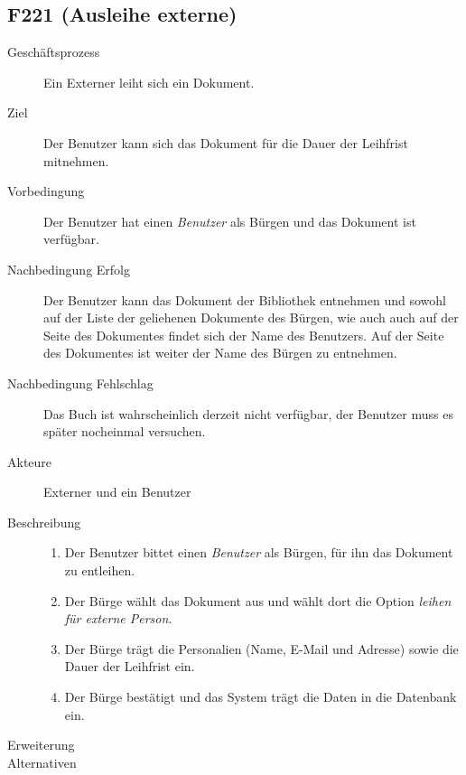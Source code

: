 \subsection{F221 (Ausleihe externe)}
\begin{description}
  \item[Geschäftsprozess]Ein Externer leiht sich ein Dokument.
  \item[Ziel]Der Benutzer kann sich das Dokument für die Dauer der Leihfrist mitnehmen.
  \item[Vorbedingung]Der Benutzer hat einen \emph{Benutzer} als Bürgen und das Dokument ist verfügbar.
  \item[Nachbedingung Erfolg]Der Benutzer kann das Dokument der Bibliothek entnehmen und sowohl auf der Liste der geliehenen Dokumente des Bürgen, wie auch auch auf der Seite des Dokumentes findet sich der Name des  Benutzers. Auf der Seite des Dokumentes ist weiter der Name des Bürgen zu entnehmen.
  \item[Nachbedingung Fehlschlag]Das Buch ist wahrscheinlich derzeit nicht verfügbar, der Benutzer muss es später nocheinmal versuchen.
  \item[Akteure]Externer und ein Benutzer 
  \item[Beschreibung]\hfill
    \begin{enumerate}
      \item Der Benutzer bittet einen \emph{Benutzer} als Bürgen, für ihn das Dokument zu entleihen.
      \item Der Bürge wählt das Dokument aus und wählt dort die Option \emph{leihen für externe Person}.
      \item Der Bürge trägt die Personalien (Name, E-Mail und Adresse) sowie die Dauer der Leihfrist ein.
      \item Der Bürge bestätigt und das System trägt die Daten in die Datenbank ein.
    \end{enumerate}
  \item[Erweiterung]
  \item[Alternativen]
\end{description}

